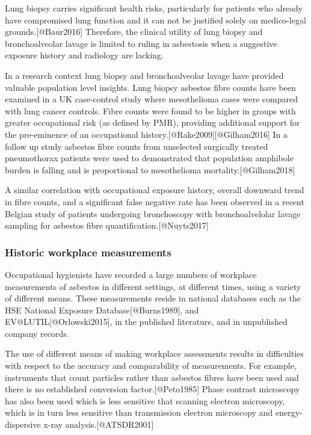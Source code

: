 \documentclass[
]{article}
\begin{document}
Lung biopsy carries significant health risks, particularly for patients
who already have compromised lung function and it can not be justified
solely on medico-legal grounds.{[}@Baur2016{]} Therefore, the clinical
utility of lung biopsy and bronchoalveolar lavage is limited to ruling
in asbestosis when a suggestive exposure history and radiology are
lacking.

In a research context lung biopsy and bronchoalveolar lavage have
provided valuable population level insights. Lung biopsy asbestos fibre
counts have been examined in a UK case-control study where mesothelioma
cases were compared with lung cancer controls. Fibre counts were found
to be higher in groups with greater occupational risk (as defined by
PMR), providing additional support for the pre-eminence of an
occupational history.{[}@Rake2009{]}{[}@Gilham2016{]} In a follow up
study asbestos fibre counts from unselected surgically treated
pneumothorax patients were used to demonstrated that population
amphibole burden is falling and is proportional to mesothelioma
mortality.{[}@Gilham2018{]}

A similar correlation with occupational exposure history, overall
downward trend in fibre counts, and a significant false negative rate
has been observed in a recent Belgian study of patients undergoing
bronchoscopy with bronchoalvelolar lavage sampling for asbestos fibre
quantification.{[}@Nuyts2017{]}

\hypertarget{historic-workplace-measurements}{%
\subsubsection{Historic workplace
measurements}\label{historic-workplace-measurements}}

Occupational hygienists have recorded a large numbers of workplace
measurements of asbestos in different settings, at different times,
using a variety of different means. These measurements reside in
national databases such as the HSE National Exposure
Database{[}@Burns1989{]}, and EV@LUTIL{[}@Orlowski2015{]}, in the
published literature, and in unpublished company records.

The use of different means of making workplace assessments results in
difficulties with respect to the accuracy and comparability of
measurements. For example, instruments that count particles rather than
asbestos fibres have been used and there is no established conversion
factor.{[}@Peto1985{]} Phase contrast microscopy has also been used
which is less sensitive that scanning electron microscopy, which is in
turn less sensitive than transmission electron microscopy and
energy-dispersive x-ray analysis.{[}@ATSDR2001{]}
\end{document}
